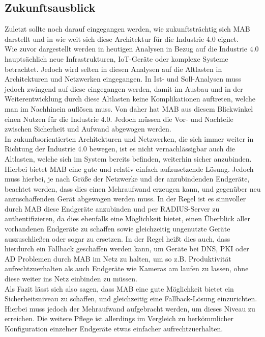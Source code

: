 \documentclass[conference]{IEEEtran}
\begin{document}
\vspace{.5em}
\subsection{Zukunftsausblick}

Zuletzt sollte noch darauf eingegangen werden, wie zukunftsträchtig sich MAB darstellt und in wie weit sich diese Architektur für die Industrie 4.0 eignet.\\

Wie zuvor dargestellt werden in heutigen Analysen in Bezug auf die Industrie 4.0 hauptsächlich neue Infrastrukturen, IoT-Geräte oder komplexe Systeme betrachtet. Jedoch wird selten in diesen Analysen auf die Altlasten in Architekturen und Netzwerken eingegangen. In Ist- und Soll-Analysen muss jedoch zwingend auf diese eingegangen werden, damit im Ausbau und in der Weiterentwicklung durch diese Altlasten keine Komplikationen auftreten, welche man im Nachhinein auflösen muss. Von daher hat MAB aus diesem Blickwinkel einen Nutzen für die Industrie 4.0. Jedoch müssen die Vor- und Nachteile zwischen Sicherheit und Aufwand abgewogen werden.\\

In zukunftsorientierten Architekturen und Netzwerken, die sich immer weiter in Richtung der Industrie 4.0 bewegen, ist es nicht vernachlässigbar auch die Altlasten, welche sich im System bereits befinden, weiterhin sicher anzubinden. Hierbei bietet MAB eine gute und relativ einfach aufzusetzende Lösung. Jedoch muss hierbei, je nach Größe der Netzwerke und der anzubindenden Endgeräte, beachtet werden, dass dies einen Mehraufwand erzeugen kann, und gegenüber neu anzuschaffenden Gerät abgewogen werden muss. In der Regel ist es sinnvoller durch MAB diese Endgeräte anzubinden und per RADIUS-Server zu authentifizieren, da dies ebenfalls eine Möglichkeit bietet, einen Überblick aller vorhandenen Endgeräte zu schaffen sowie gleichzeitig ungenutzte Geräte auszuschließen oder sogar zu ersetzen. In der Regel heißt dies auch, dass hierdurch ein Fallback geschaffen werden kann, um Geräte bei DNS, PKI oder AD Problemen durch MAB im Netz zu halten, um so z.B. Produktivität aufrechtzuerhalten als auch Endgeräte wie Kameras am laufen zu lassen, ohne diese weiter ins Netz einbinden zu müssen.\\

Als Fazit lässt sich also sagen, dass MAB eine gute Möglichkeit bietet ein Sicherheitsniveau zu schaffen, und gleichzeitig eine Fallback-Lösung einzurichten. Hierbei muss jedoch der Mehraufwand aufgebracht werden, um dieses Niveau zu erreichen. Die weitere Pflege ist allerdings im Vergleich zu herkömmlicher Konfiguration einzelner Endgeräte etwas einfacher aufrechtzuerhalten.

%

\vspace{1em}


\end{document}
